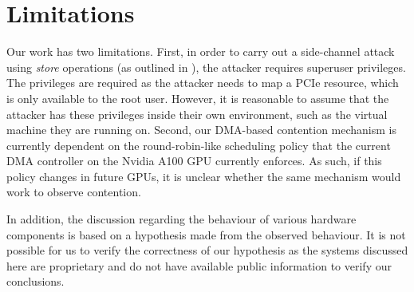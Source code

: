 \section{Limitations}
\label{sec:interconnect-sc-limitations}

Our work has two limitations.
First, in order to carry out a side-channel attack using \textit{store} operations (as outlined in ), the attacker requires superuser privileges.
The privileges are required as the attacker needs to map a PCIe resource, which is only available to the root user.
However, it is reasonable to assume that the attacker has these privileges inside their own environment, such as the virtual machine they are running on.
Second, our DMA-based contention mechanism is currently dependent on the round-robin-like scheduling policy that the current DMA controller on the Nvidia A100 GPU currently enforces.
As such, if this policy changes in future GPUs, it is unclear whether the same mechanism would work to observe contention.

In addition, the discussion regarding the behaviour of various hardware components is based on a hypothesis made from the observed behaviour.
It is not possible for us to verify the correctness of our hypothesis as the systems discussed here are proprietary and do not have available public information to verify our conclusions.